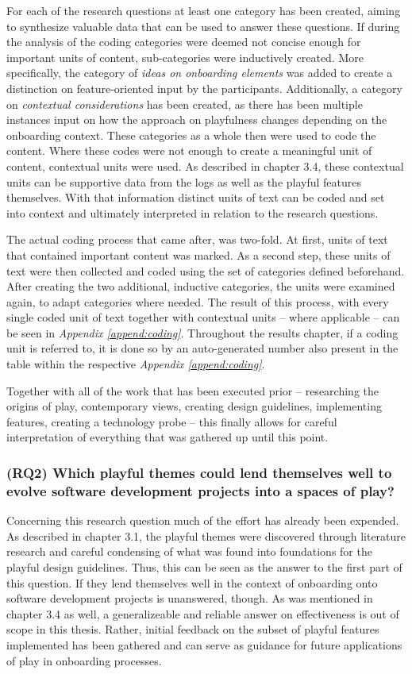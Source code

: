 For each of the research questions at least one category has been created, aiming to synthesize valuable data that can be used to answer these questions. If during the analysis of the coding categories were deemed not concise enough for important units of content, sub-categories were inductively created. More specifically, the category of \textit{ideas on onboarding elements} was added to create a distinction on feature-oriented input by the participants. Additionally, a category on \textit{contextual considerations} has been created, as there has been multiple instances input on how the approach on playfulness changes depending on the onboarding context. These categories as a whole then were used to code the content. Where these codes were not enough to create a meaningful unit of content, contextual units were used. As described in chapter 3.4, these contextual units can be supportive data from the logs as well as the playful features themselves. With that information distinct units of text can be coded and set into context and ultimately interpreted in relation to the research questions.

The actual coding process that came after, was two-fold. At first, units of text that contained important content was marked. As a second step, these units of text were then collected and coded using the set of categories defined beforehand. After creating the two additional, inductive categories, the units were examined again, to adapt categories where needed. The result of this process, with every single coded unit of text together with contextual units -- where applicable -- can be seen in \textit{Appendix \ref{append:coding}}. Throughout the results chapter, if a coding unit is referred to, it is done so by an auto-generated number also present in the table within the respective \textit{Appendix \ref{append:coding}}.

Together with all of the work that has been executed prior -- researching the origins of play, contemporary views, creating design guidelines, implementing features, creating a technology probe -- this finally allows for careful interpretation of everything that was gathered up until this point.

\subsubsection*{(RQ2) Which playful themes could lend themselves well to evolve software development projects into a spaces of play?}

Concerning this research question much of the effort has already been expended. As described in chapter 3.1, the playful themes were discovered through literature research and careful condensing of what was found into foundations for the playful design guidelines. Thus, this can be seen as the answer to the first part of this question. If they lend themselves well in the context of onboarding onto software development projects is unanswered, though. As was mentioned in chapter 3.4 as well, a generalizeable and reliable answer on effectiveness is out of scope in this thesis. Rather, initial feedback on the subset of playful features implemented has been gathered and can serve as guidance for future applications of play in onboarding processes.

